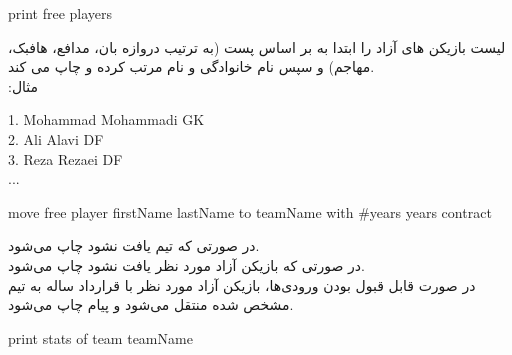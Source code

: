 \documentclass[]{article}
\begin{document}
\hrulefill

\begin{tcolorbox}[boxrule=0pt]
	\begin{latin}
		\large{
			print free players
		}
	\end{latin}
\end{tcolorbox}

لیست بازیکن های آزاد را ابتدا به بر اساس پست (به ترتیب دروازه بان، مدافع، هافبک، مهاجم) و سپس نام خانوادگی و نام
مرتب کرده و چاپ می کند.
\\
‫ﻣﺜﺎل:
\begin{tcolorbox}[boxrule=0pt]
	\begin{latin}
		\large{
			1. Mohammad Mohammadi GK
			\\
			2. Ali Alavi DF
			\\
			3. Reza Rezaei DF
			\\
			...
		}
	\end{latin}
\end{tcolorbox}

\hrulefill

\begin{tcolorbox}[boxrule=0pt]
	\begin{latin}
		\large{
			move free player firstName lastName to teamName with \#years years 
			contract
		}
	\end{latin}
\end{tcolorbox}

در ﺻﻮرﺗﯽ ﮐﻪ ﺗﯿﻢ ﯾﺎﻓﺖ ﻧﺸﻮد‬‬‬  چاپ ﻣﯽﺷﻮد.
\\
در ﺻﻮرﺗﯽ ﮐﻪ ﺑﺎزﯾﮑﻦ آزاد ﻣﻮرد ﻧﻈﺮ ﯾﺎﻓﺖ ﻧﺸﻮد  ﭼﺎپ 
ﻣﯽﺷﻮد.
\\
در ﺻﻮرت ﻗﺎﺑﻞ ﻗﺒﻮل ﺑﻮدن ورودیﻫﺎ‬‬‬‬، ﺑﺎزﯾﮑﻦ آزاد ﻣﻮرد ﻧﻈﺮ ﺑﺎ ﻗﺮارداد‬ 
 ساله به تیم مشخص شده منتقل ﻣﯽﺷﻮد و ﭘﯿﺎم  ﭼﺎپ 
ﻣﯽﺷﻮد.

\hrulefill

\begin{tcolorbox}[boxrule=0pt]
	\begin{latin}
		\large{
			print stats of team teamName
		}
	\end{latin}
\end{tcolorbox}
\end{document}
